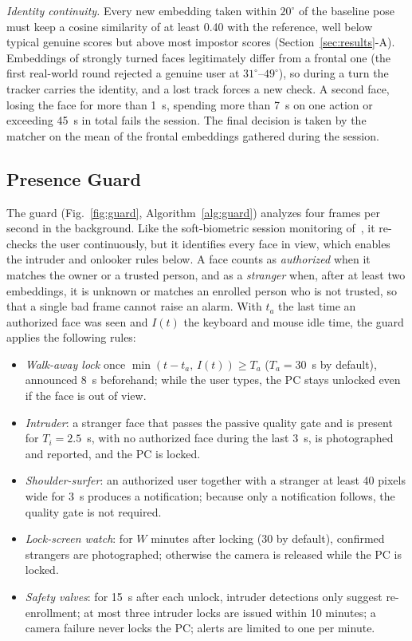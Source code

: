 \documentclass[journal]{IEEEtran}
\begin{document}
\emph{Identity continuity.} Every new embedding taken within $20^\circ$ of the baseline pose must keep a cosine similarity of at least 0.40 with the reference, well below typical genuine scores but above most impostor scores (Section~\ref{sec:results}-A). Embeddings of strongly turned faces legitimately differ from a frontal one (the first real-world round rejected a genuine user at $31^\circ$--$49^\circ$), so during a turn the tracker carries the identity, and a lost track forces a new check. A second face, losing the face for more than 1~s, spending more than 7~s on one action or exceeding 45~s in total fails the session. The final decision is taken by the matcher on the mean of the frontal embeddings gathered during the session.

\subsection{Presence Guard}\label{sec:guard}
The guard (Fig.~\ref{fig:guard}, Algorithm~\ref{alg:guard}) analyzes four frames per second in the background. Like the soft-biometric session monitoring of~\cite{niinuma2010soft}, it re-checks the user continuously, but it identifies every face in view, which enables the intruder and onlooker rules below. A face counts as \emph{authorized} when it matches the owner or a trusted person, and as a \emph{stranger} when, after at least two embeddings, it is unknown or matches an enrolled person who is not trusted, so that a single bad frame cannot raise an alarm. With $t_a$ the last time an authorized face was seen and $I(t)$ the keyboard and mouse idle time, the guard applies the following rules:
\begin{itemize}
\item \emph{Walk-away lock} once $\min(t-t_a,\,I(t))\ge T_a$ ($T_a=30$~s by default), announced 8~s beforehand; while the user types, the PC stays unlocked even if the face is out of view.
\item \emph{Intruder}: a stranger face that passes the passive quality gate and is present for $T_i=2.5$~s, with no authorized face during the last 3~s, is photographed and reported, and the PC is locked.
\item \emph{Shoulder-surfer}: an authorized user together with a stranger at least 40 pixels wide for 3~s produces a notification; because only a notification follows, the quality gate is not required.
\item \emph{Lock-screen watch}: for $W$ minutes after locking (30 by default), confirmed strangers are photographed; otherwise the camera is released while the PC is locked.
\item \emph{Safety valves}: for 15~s after each unlock, intruder detections only suggest re-enrollment; at most three intruder locks are issued within 10 minutes; a camera failure never locks the PC; alerts are limited to one per minute.
\end{itemize}
\end{document}
